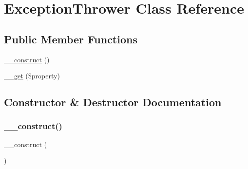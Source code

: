 \hypertarget{class_sebastian_bergmann_1_1_object_enumerator_1_1_fixtures_1_1_exception_thrower}{}\section{Exception\+Thrower Class Reference}
\label{class_sebastian_bergmann_1_1_object_enumerator_1_1_fixtures_1_1_exception_thrower}
\subsection*{Public Member Functions}
\begin{DoxyCompactItemize}
\item 
\mbox{\hyperlink{class_sebastian_bergmann_1_1_object_enumerator_1_1_fixtures_1_1_exception_thrower_a095c5d389db211932136b53f25f39685}{\+\_\+\+\_\+construct}} ()
\item 
\mbox{\hyperlink{class_sebastian_bergmann_1_1_object_enumerator_1_1_fixtures_1_1_exception_thrower_a6481e8cfc93c80885b3d72a6e1f15a1f}{\+\_\+\+\_\+get}} (\$property)
\end{DoxyCompactItemize}


\subsection{Constructor \& Destructor Documentation}
\mbox{\label{class_sebastian_bergmann_1_1_object_enumerator_1_1_fixtures_1_1_exception_thrower_a095c5d389db211932136b53f25f39685}} 
\subsubsection{\texorpdfstring{\+\_\+\+\_\+construct()}{\_\_construct()}}
{\footnotesize\ttfamily \+\_\+\+\_\+construct (\begin{DoxyParamCaption}{ }\end{DoxyParamCaption})}



